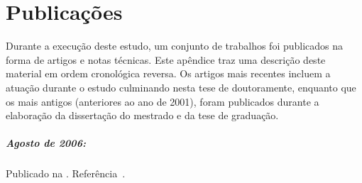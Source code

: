 \typeout{ ====================================================================}
\typeout{ ====================================================================}












\chapter{Publicações}
\label{chap:published}

Durante a execução deste estudo, um conjunto de trabalhos foi publicados na
forma de artigos e notas técnicas. Este apêndice traz uma descrição deste
material em ordem cronológica reversa. Os artigos mais recentes incluem a
atuação durante o estudo culminando nesta tese de doutoramente, enquanto que
os mais antigos (anteriores ao ano de 2001), foram publicados durante a
elaboração da dissertação do mestrado e da tese de graduação.

\paragraph{Agosto de 2006: } Publicado na . Referência~\cite{aa:tns-06}.

